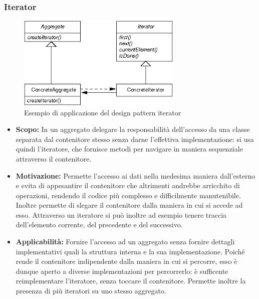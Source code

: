 \documentclass{scalatekids-article}
\begin{document}
\subsubsection{Iterator}
\begin{figure}[H]
	\begin{center}
		\includegraphics[width=0.7\textwidth, keepaspectratio]{img/designPattern/IteratorPattern.png}
		\caption{Esempio di applicazione del design pattern iterator}
	\end{center}
\end{figure}
\begin{itemize}
	\item \textbf{Scopo:} In un aggregato delegare la responsabilità dell'accesso da una classe separata dal contenitore stesso senza darne l'effettiva implementazione: si usa quindi l'iteratore, che fornisce metodi per navigare in maniera sequenziale attraverso il contenitore.
	\item \textbf{Motivazione:} Permette l'accesso ai dati nella medesima maniera dall'esterno e evita di appesantire il contenitore che altrimenti andrebbe arricchito di operazioni, rendendo il codice più complesso e difficilmente manutenibile. Inoltre permette di slegare il contenitore dalla maniera in cui si accede ad esso. Attraverso un iteratore si può inoltre ad esempio tenere traccia dell'elemento corrente, del precedente e del successivo.
	\item \textbf{Applicabilità:} Fornire l'accesso ad un aggregato senza fornire dettagli implementativi quali la struttura interna e la sua implementazione. Poiché rende  il contenitore indipendente dalla maniera in cui si percorre, esso è dunque aperto a diverse implementazioni per percorrerlo: è sufficente reimplementare l'iteratore, senza toccare il contenitore. Permette inoltre la presenza di più iteratori su uno stesso aggregato.
\end{itemize}
\end{document}
